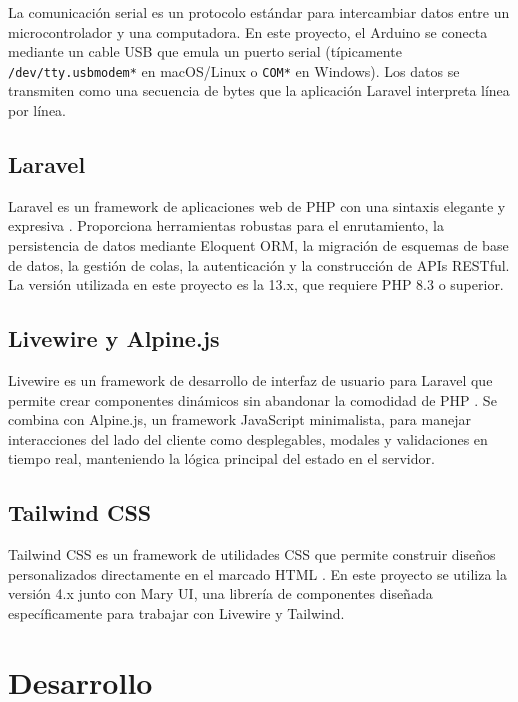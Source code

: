 \documentclass[12pt,a4paper]{report}
\begin{document}
La comunicación serial es un protocolo estándar para intercambiar datos entre un microcontrolador y una computadora. En este proyecto, el Arduino se conecta mediante un cable USB que emula un puerto serial (típicamente \texttt{/dev/tty.usbmodem*} en macOS/Linux o \texttt{COM*} en Windows). Los datos se transmiten como una secuencia de bytes que la aplicación Laravel interpreta línea por línea.

\section{Laravel}
\label{sec:laravel}

Laravel es un framework de aplicaciones web de PHP con una sintaxis elegante y expresiva \cite{laravel2024}. Proporciona herramientas robustas para el enrutamiento, la persistencia de datos mediante Eloquent ORM, la migración de esquemas de base de datos, la gestión de colas, la autenticación y la construcción de APIs RESTful. La versión utilizada en este proyecto es la 13.x, que requiere PHP 8.3 o superior.

\section{Livewire y Alpine.js}
\label{sec:livewire}

Livewire es un framework de desarrollo de interfaz de usuario para Laravel que permite crear componentes dinámicos sin abandonar la comodidad de PHP \cite{livewire2024}. Se combina con Alpine.js, un framework JavaScript minimalista, para manejar interacciones del lado del cliente como desplegables, modales y validaciones en tiempo real, manteniendo la lógica principal del estado en el servidor.

\section{Tailwind CSS}
\label{sec:tailwind}

Tailwind CSS es un framework de utilidades CSS que permite construir diseños personalizados directamente en el marcado HTML \cite{tailwind2024}. En este proyecto se utiliza la versión 4.x junto con Mary UI, una librería de componentes diseñada específicamente para trabajar con Livewire y Tailwind.

\chapter{Desarrollo}
\label{ch:desarrollo}
\end{document}

